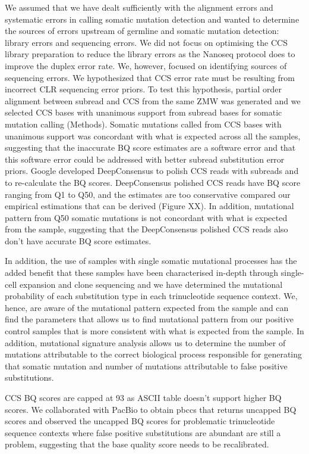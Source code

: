 We assumed that we have dealt sufficiently with the alignment errors and systematic errors in calling somatic mutation detection and wanted to determine the sources of errors upstream of germline and somatic mutation detection: library errors and sequencing errors. We did not focus on optimising the CCS library preparation to reduce the library errors as the Nanoseq protocol does to improve the duplex error rate. We, however, focused on identifying sources of sequencing errors. We hypothesized that CCS error rate must be resulting from incorrect CLR sequencing error priors. To test this hypothesis, partial order alignment between subread and CCS from the same ZMW was generated and we selected CCS bases with unanimous support from subread bases for somatic mutation calling (Methods). Somatic mutations called from CCS bases with unanimous support was concordant with what is expected across all the samples, suggesting that the inaccurate BQ score estimates are a software error and that this software error could be addressed with better subread substitution error priors. Google developed DeepConsensus to polish CCS reads with subreads and to re-calculate the BQ scores. DeepConsensus polished CCS reads have BQ score ranging from Q1 to Q50, and the estimates are too conservative compared our empirical estimations that can be derived (Figure XX). In addition, mutational pattern from Q50 somatic mutations is not concordant with what is expected from the sample, suggesting that the DeepConsensus polished CCS reads also don’t have accurate BQ score estimates.

In addition, the use of samples with single somatic mutational processes has the added benefit that these samples have been characterised in-depth through single-cell expansion and clone sequencing and we have determined the mutational probability of each substitution type in each trinucleotide sequence context. We, hence, are aware of the mutational pattern expected from the sample and can find the parameters that allows us to find mutational pattern from our positive control samples that is more consistent with what is expected from the sample. In addition, mutational signature analysis allows us to determine the number of mutations attributable to the correct biological process responsible for generating that somatic mutation and number of mutations attributable to false positive substitutions. 

CCS BQ scores are capped at 93 as ASCII table doesn’t support higher BQ scores. We collaborated with PacBio to obtain pbccs that returns uncapped BQ scores and observed the uncapped BQ scores for problematic trinucleotide sequence contexts where false positive substitutions are abundant are still a problem, suggesting that the base quality score needs to be recalibrated. 


